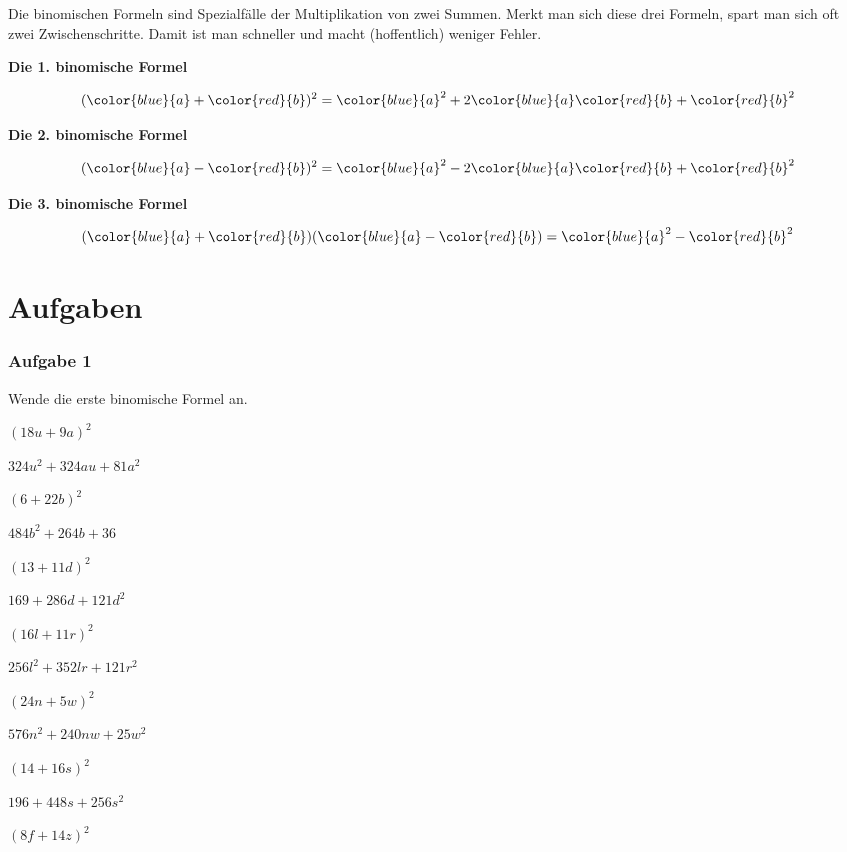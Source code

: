\documentclass[
  ngerman,
]{book}
\begin{document}
Die binomischen Formeln sind Spezialfälle der Multiplikation von zwei Summen. Merkt man sich diese drei Formeln, spart man sich oft zwei Zwischenschritte. Damit ist man schneller und macht (hoffentlich) weniger Fehler.

\textbf{Die 1. binomische Formel}

\[(\color{blue}{a}+\color{red}{b})^2= \color{blue}{a}^2 +2\color{blue}{a}\color{red}{b} + \color{red}{b}^2\]

\textbf{Die 2. binomische Formel}

\[(\color{blue}{a}-\color{red}{b})^2= \color{blue}{a}^2 -2\color{blue}{a}\color{red}{b} + \color{red}{b}^2\]

\textbf{Die 3. binomische Formel}

\[(\color{blue}{a}+\color{red}{b})(\color{blue}{a}-\color{red}{b}) = \color{blue}{a}^2 - \color{red}{b}^2\]

\hypertarget{aufgaben}{%
\section*{Aufgaben}\label{aufgaben}}

\hypertarget{aufgabe-1}{%
\subsubsection*{Aufgabe 1}\label{aufgabe-1}}

Wende die erste binomische Formel an.

\((18u+9a)^2\)

\leavevmode\hypertarget{toggleText1}{}%
\(324u^2+324au+81a^2\)

\((6+22b)^2\)

\leavevmode\hypertarget{toggleText2}{}%
\(484b^2+264b+36\)

\((13+11d)^2\)

\leavevmode\hypertarget{toggleText3}{}%
\(169+286d+121d^2\)

\((16l+11r)^2\)

\leavevmode\hypertarget{toggleText4}{}%
\(256l^2+352lr+121r^2\)

\((24n+5w)^2\)

\leavevmode\hypertarget{toggleText5}{}%
\(576n^2+240nw+25w^2\)

\((14+16s)^2\)

\leavevmode\hypertarget{toggleText6}{}%
\(196+ 448s+256s^2\)

\((8f+14z)^2\)
\end{document}
